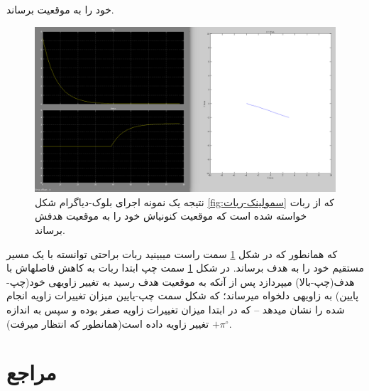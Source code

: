 \documentclass[10pt,a4paper]{article}
\newcommand{\نیمفاصله}{\halfspace}
\renewcommand{\ }{\halfspace}
\newcommand{\renderref}[1] { \begingroup \let\clearpage\relax  \endgroup }
\begin{document}
خود را به موقعیت
برساند.
\begin{figure}[H]
    \centering
    \includegraphics[width=1\textwidth]{deminer-simu-result}
    \caption{نتیجه یک نمونه اجرای بلوک-دیاگرام شکل
\ref{fig:سمولینک-ربات}
که از ربات خواسته شده است که موقعیت کنونی\ اش خود را به موقعیت هدفش برساند.     
    }
    \label{fig:نتیجه-سمولینک-ربات}
\end{figure}
که همانطور که در شکل
\ref{fig:نتیجه-سمولینک-ربات}
سمت راست میبینید ربات براحتی توانسته با یک مسیر مستقیم خود را به هدف برساند. در شکل
\ref{fig:نتیجه-سمولینک-ربات}
سمت چپ ابتدا ربات به کاهش فاصله\ اش با هدف(چپ-بالا) میپردازد پس از آنکه به موقعیت هدف رسید به تغییر زاویه\ ی خود(چپ-پایین) به زاویه\ ی دلخواه می\ رساند؛ که شکل سمت چپ-یایین میزان تغییرات زاویه انجام شده را نشان می\ دهد -- که در ابتدا میزان تغییرات زاویه صفر بوده و سپس به اندازه $+\pi^\circ$ تغییر زاویه داده است(همانطور که انتظار میرفت).
\section{مراجع}
\renderref{reference}
\end{document}
